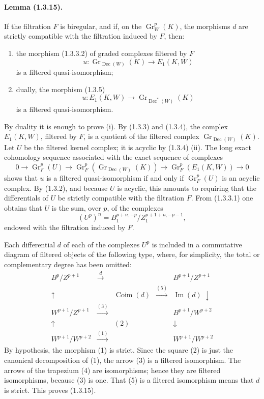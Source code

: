 \documentclass[10pt]{article}
\newcommand{\Gr}{\operatorname{Gr}}
\newcommand{\Coim}{\operatorname{Coim}}
\newcommand{\Imop}{\operatorname{Im}}
\newcommand{\Dec}{\operatorname{Dec}}
\begin{document}
\paragraph{Lemma (1.3.15).} If the filtration $F$ is biregular, and if, on the $\Gr_W^p(K)$, the morphisms $d$ are strictly compatible with the filtration induced by $F$, then:
\begin{enumerate}[label=(\roman*)]
\item the morphism (1.3.3.2) of graded complexes filtered by $F$
\[
u:\Gr_{\Dec(W)}(K)\longrightarrow E_1(K,W)
\]
is a filtered quasi-isomorphism;
\item dually, the morphism (1.3.5)
\[
u:E_1(K,W)\longrightarrow \Gr_{\Dec^*(W)}(K)
\]
is a filtered quasi-isomorphism.
\end{enumerate}
By duality it is enough to prove (i). By (1.3.3) and (1.3.4), the complex $E_1(K,W)$, filtered by $F$, is a quotient of the filtered complex $\Gr_{\Dec(W)}(K)$. Let $U$ be the filtered kernel complex; it is acyclic by (1.3.4) (ii). The long exact cohomology sequence associated with the exact sequence of complexes
\[
0\to\Gr_F^p(U)\to\Gr_F^p(\Gr_{\Dec(W)}(K))\to\Gr_F^p(E_1(K,W))\to0
\]
shows that $u$ is a filtered quasi-isomorphism if and only if $\Gr_F^p(U)$ is an acyclic complex. By (1.3.2), and because $U$ is acyclic, this amounts to requiring that the differentials of $U$ be strictly compatible with the filtration $F$. From (1.3.3.1) one obtains that $U$ is the sum, over $p$, of the complexes
\[
(U^p)^n=B_1^{p+n,-p}/Z_1^{p+1+n,-p-1},
\]
endowed with the filtration induced by $F$.

Each differential $d$ of each of the complexes $U^p$ is included in a commutative diagram of filtered objects of the following type, where, for simplicity, the total or complementary degree has been omitted:
\[
\begin{array}{ccccc}
B^p/Z^{p+1} & \xrightarrow{\ d\ } & & & B^{p+1}/Z^{p+1}\\[0.5em]
\uparrow & & \Coim(d) & \xrightarrow{(5)} & \Imop(d)\ \downarrow\\[0.5em]
W^{p+1}/Z^{p+1} & \xrightarrow{(3)} & & & B^{p+1}/W^{p+2}\\[0.5em]
\uparrow & & (2) & & \downarrow\\[0.5em]
W^{p+1}/W^{p+2} & \xrightarrow{(1)} & & & W^{p+1}/W^{p+2}
\end{array}
\]
By hypothesis, the morphism (1) is strict. Since the square (2) is just the canonical decomposition of (1), the arrow (3) is a filtered isomorphism. The arrows of the trapezium (4) are isomorphisms; hence they are filtered isomorphisms, because (3) is one. That (5) is a filtered isomorphism means that $d$ is strict. This proves (1.3.15).
\end{document}
